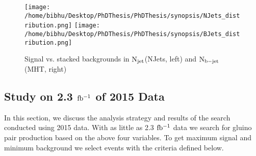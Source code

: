\begin{figure}[h]
\begin{center}
\texttt{[image: /home/bibhu/Desktop/PhDThesis/PhDThesis/synopsis/NJets\_distribution.png]}
\texttt{[image: /home/bibhu/Desktop/PhDThesis/PhDThesis/synopsis/BJets\_distribution.png]}
\caption{\label{fig:SigvsBkgSearchVariables2Synop} Signal vs. stacked backgrounds in $\rm N_{jet}$(NJets, left) and $\rm N_{b-jet}$(MHT, right)}
\end{center}
\end{figure}


\subsection{Study on 2.3 $\rm fb^{-1}$ of 2015 Data}

In this section, we discuss the analysis strategy and results of the search conducted using 2015 data. With as little as 
2.3 $\rm fb^{-1}$ data we search for gluino pair production based on the above four variables. To get maximum signal and minimum background we select events with the criteria defined below.

